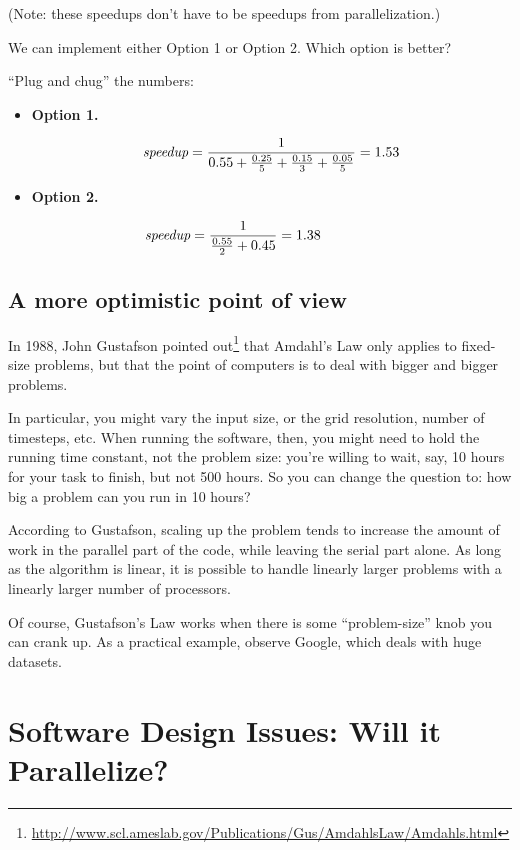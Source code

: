 \documentclass[a4paper]{report}
\begin{document}
     (Note: these speedups don't have to be speedups from parallelization.)
    
   We can implement either Option 1 or Option 2. 
   Which option is better?

   ``Plug and chug'' the numbers:
 \begin{itemize}
 \item  {\bf Option 1.}

   \[ \mbox{\em speedup} = \frac{1}{0.55 + \frac{0.25}{5} + \frac{0.15}{3} + \frac{0.05}{5}}
     = 1.53  \]

 \item  {\bf Option 2.}

   \[\mbox{\em speedup} = \frac{1}{\frac{0.55}{2} + 0.45} = 1.38 \hspace*{5.5em}\]
\end{itemize}

\subsection*{A more optimistic point of view}
In 1988, John Gustafson pointed
out\footnote{\url{http://www.scl.ameslab.gov/Publications/Gus/AmdahlsLaw/Amdahls.html}}
that Amdahl's Law only applies to fixed-size problems, but that the
point of computers is to deal with bigger and bigger problems.

In particular, you might vary the input size, or the grid resolution,
number of timesteps, etc. When running the software, then, you might
need to hold the running time constant, not the problem size: you're
willing to wait, say, 10 hours for your task to finish, but not 500
hours. So you can change the question to: how big a problem can you
run in 10 hours?

According to Gustafson, scaling up the problem tends to increase the
amount of work in the parallel part of the code, while leaving the
serial part alone. As long as the algorithm is linear, it is possible
to handle linearly larger problems with a linearly larger number of
processors.

Of course, Gustafson's Law works when there is some ``problem-size''
knob you can crank up.  As a practical example, observe Google, which
deals with huge datasets.


\section*{Software Design Issues: Will it Parallelize?}
\end{document}
